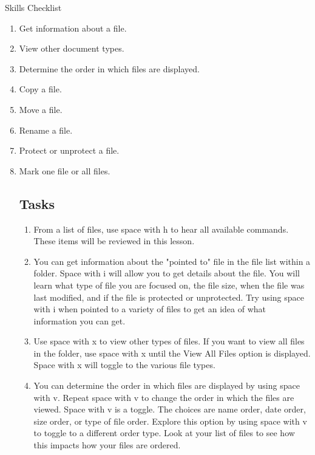 \documentclass[10pt,letterpaper,twoside]{report}
\begin{document}
{{{{Skills Checklist



\begin{enumerate}
	\item Get information about a file.
	      
	\item View other document types.
	      
	\item Determine the order in which files are displayed.
	      
	\item Copy a file.
	      
	\item Move a file.
	      
	\item Rename a file.
	      
	\item Protect or unprotect a file.
	      
	\item Mark one file or all files.
	      
	      
	      
	       \subsection{Tasks}
	      
	      
	      
	      \begin{enumerate}
		      \item From a list of files, use space with h to hear all available commands.  These items will be reviewed in this lesson.
		            
		      \item You can get information about the "pointed to" file in the file list within a folder.  Space with i will allow you to get details about the file.  You will learn what type of file you are focused on, the file size, when the file was last modified, and if the file is protected or unprotected.  Try using space with i when pointed to a variety of files to get an idea of what information you can get.
		            
		      \item Use space with x to view other types of files.  If you want to view all files in the folder, use space with x until the View All Files option is displayed.  Space with x will toggle to the various file types.
		            
		      \item You can determine the order in which files are displayed by using space with v.  Repeat space with v to change the order in which the files are viewed.  Space with v is a toggle.  The choices are name order, date order, size order, or type of file order.  Explore this option by using space with v to toggle to a different order type.  Look at your list of files to see how this impacts how your files are ordered.
		            

\end{enumerate}
\end{enumerate}}}}}
\end{document}
